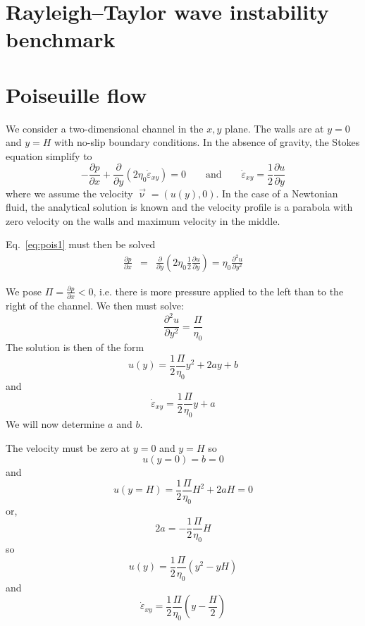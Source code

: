 
\newpage
\section{Rayleigh–Taylor wave instability benchmark \label{ss:rtwave}}





\newpage
\section{Poiseuille flow} \label{ss:poiseuille}

We consider a two-dimensional channel in the $x,y$ plane. The walls 
are at $y=0$ and $y=H$ with no-slip boundary conditions. 
In the absence of gravity, the Stokes equation simplify to 
\begin{equation}
-\frac{\partial p}{\partial x}  +\frac{\partial }{\partial y} (2\eta_0 \dot{\varepsilon}_{xy}) =0
\qquad
\text{and}
\qquad
\dot{\varepsilon}_{xy} = \frac{1}{2} \frac{\partial u}{\partial y} 
\label{eq:pois1}
\end{equation}
where we assume the velocity $\vec\upnu=(u(y),0)$.
In the case of a Newtonian fluid, the analytical solution is 
known and the velocity profile is a parabola with zero velocity on the
walls and maximum velocity in the middle. 


Eq.~\eqref{eq:pois1} must then be solved 
\begin{eqnarray}
\frac{\partial p}{\partial x}  
&=&\frac{\partial }{\partial y} \left(2\eta_{0}  \frac{1}{2}\frac{\partial u}{\partial y} \right) 
= \eta_0 \frac{\partial^2 u}{\partial y^2}  
\end{eqnarray}

We pose $\Pi=\frac{\partial p}{\partial x}<0$, i.e. 
there is more pressure applied to the left than to the right of the channel.
We then must solve:
\[
\frac{\partial^2 u}{\partial y^2} = \frac{\Pi}{\eta_0} 
\]
The solution is then of the form
\[
u(y) = \frac{1}{2}\frac{\Pi}{\eta_0} y^2 + 2a y + b
\]
and 
\[
\dot{\varepsilon}_{xy}= \frac{1}{2} \frac{\Pi}{\eta_0}y  + a
\]
We will now determine $a$ and $b$.

The velocity must be zero at $y=0$ and $y=H$ so 
\[
u(y=0)=b=0
\] 
and 
\[
u(y=H)=\frac{1}{2}\frac{\Pi}{\eta_0} H^2 + 2a H =0
\]
or, 
\[
2a=-\frac{1}{2}\frac{\Pi}{\eta_0} H
\]
so 
\begin{equation}
\boxed{
u(y) = \frac{1}{2}\frac{\Pi}{\eta_0} (y^2 - y H)
}
\end{equation}
and 
\begin{equation}
\boxed{
\dot{\varepsilon}_{xy}= \frac{1}{2} \frac{\Pi}{\eta_0} \left(y  - \frac{H}{2} \right)
}
\end{equation}
 


